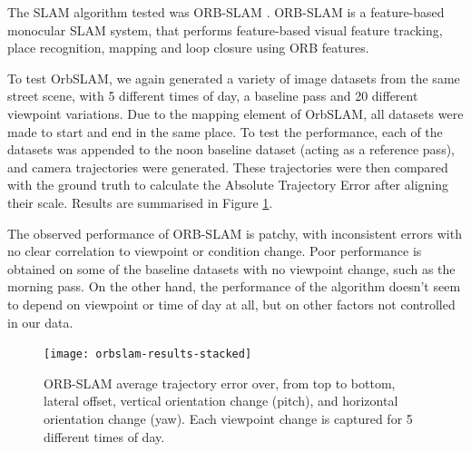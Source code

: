 \documentclass[letterpaper, 10 pt, conference]{ieeeconf}  %
\begin{document}
The SLAM algorithm tested was ORB-SLAM \cite{Montiel2015}. ORB-SLAM is a feature-based monocular SLAM system, that performs feature-based visual feature tracking, place recognition, mapping and loop closure using ORB features.

To test OrbSLAM, we again generated a variety of image datasets from the same street scene, with 5 different times of day, a baseline pass and 20 different viewpoint variations. Due to the mapping element of OrbSLAM, all datasets were made to start and end in the same place. To test the performance, each of the datasets was appended to the noon baseline dataset (acting as a reference pass), and camera trajectories were generated. These trajectories were then compared with the ground truth to calculate the Absolute Trajectory Error after aligning their scale. Results are summarised in Figure \ref{fig:orbslam-results-stacked}.

The observed performance of ORB-SLAM is patchy, with inconsistent errors with no clear correlation to viewpoint or condition change. Poor performance is obtained on some of the baseline datasets with no viewpoint change, such as the morning pass. On the other hand, the performance of the algorithm doesn't seem to depend on viewpoint or time of day at all, but on other factors not controlled in our data.

\begin{figure}[t]
    \centering
    \texttt{[image: orbslam-results-stacked]}
   \caption{ORB-SLAM average trajectory error over, from top to bottom, lateral offset, vertical orientation change (pitch), and horizontal orientation change (yaw). Each viewpoint change is captured for 5 different times of day.}
    \label{fig:orbslam-results-stacked}
\end{figure}

%
%
\end{document}
